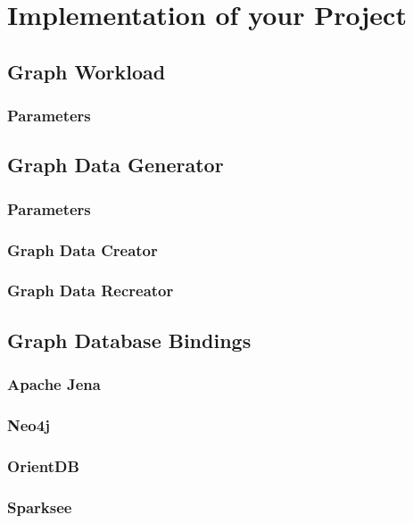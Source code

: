 \chapter{Implementation of your Project}
\label{ch:Implementation}

\section{Graph Workload}

\subsection{Parameters}

\section{Graph Data Generator}

\subsection{Parameters}

\subsection{Graph Data Creator}

\subsection{Graph Data Recreator}

\section{Graph Database Bindings}

\subsection{Apache Jena}

\subsection{Neo4j}

\subsection{OrientDB}

\subsection{Sparksee}

